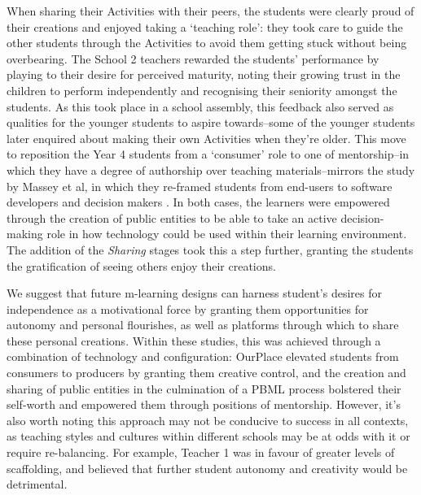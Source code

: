\documentclass[,hyphens]{sigchi}
\begin{document}
When sharing their Activities with their peers, the students were clearly proud of their creations and enjoyed taking a `teaching role': they took care to guide the other students through the Activities to avoid them getting stuck without being overbearing. The School 2 teachers rewarded the students' performance by playing to their desire for perceived maturity, noting their growing trust in the children to perform independently and recognising their seniority amongst the students. As this took place in a school assembly, this feedback also served as qualities for the younger students to aspire towards--some of the younger students later enquired about making their own Activities when they're older. This move to reposition the Year 4 students from a `consumer' role to one of mentorship--in which they have a degree of authorship over teaching materials--mirrors the study by Massey et al, in which they re-framed students from end-users to software developers and decision makers \cite{Massey2006}. In both cases, the learners were empowered through the creation of public entities to be able to take an active decision-making role in how technology could be used within their learning environment. The addition of the \textit{Sharing} stages took this a step further, granting the students the gratification of seeing others enjoy their creations.
 
We suggest that future m-learning designs can harness student's desires for independence as a motivational force by granting them opportunities for autonomy and personal flourishes, as well as platforms through which to share these personal creations. Within these studies, this was achieved through a combination of technology and configuration: OurPlace elevated students from consumers to producers by granting them creative control, and the creation and sharing of public entities in the culmination of a PBML process bolstered their self-worth and empowered them through positions of mentorship. However, it's also worth noting this approach may not be conducive to success in all contexts, as teaching styles and cultures within different schools may be at odds with it or require re-balancing. For example, Teacher 1 was in favour of greater levels of scaffolding, and believed that further student autonomy and creativity would be detrimental. 
\end{document}

